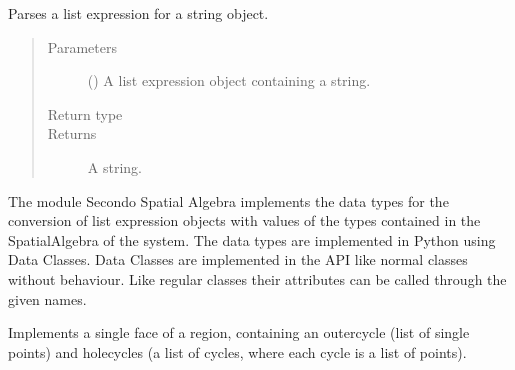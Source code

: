 \documentclass[letterpaper,10pt,english]{sphinxmanual}
\begin{document}

\begin{fulllineitems}
\label{\detokenize{index:secondodb.api.algebras.secondostandardalgebra.parse_string}}
Parses a list expression for a string object.
\begin{quote}\begin{description}
\item[{Parameters}] \leavevmode
{} () \textendash{} A list expression object containing a string.

\item[{Return type}] \leavevmode
{}

\item[{Returns}] \leavevmode
A string.

\end{description}\end{quote}

\end{fulllineitems}



\label{\detokenize{index:module-secondodb.api.algebras.secondospatialalgebra}}
The module Secondo Spatial Algebra implements the data types for the conversion of list expression objects with values
of the types contained in the SpatialAlgebra of the  system. The data types are implemented in Python
using Data Classes. Data Classes are implemented in the API like normal classes without behaviour.
Like regular classes their attributes can be called through the given names.

\begin{fulllineitems}
\label{\detokenize{index:secondodb.api.algebras.secondospatialalgebra.Face}}
Implements a single face of a region, containing an outercycle (list of single points) and holecycles (a list of
cycles, where each cycle is a list of points).

\end{fulllineitems}
\end{document}
